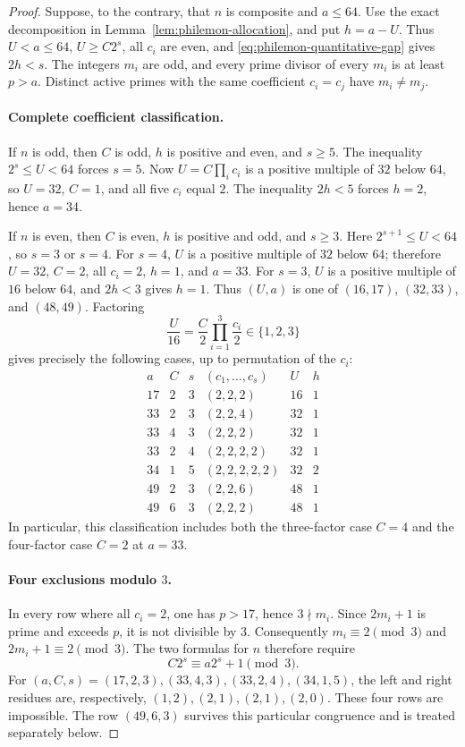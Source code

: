 \documentclass[11pt,a4paper]{article}
\theoremstyle{definition}\newtheorem{definition}[theorem]{Definition}
\theoremstyle{remark}\newtheorem{remark}[theorem]{Remark}
\begin{document}
\begin{proof}
Suppose, to the contrary, that $n$ is composite and $a\leq64$.
Use the exact decomposition in Lemma~\ref{lem:philemon-allocation}, and
put $h=a-U$.  Thus $U<a\leq64$, $U\geq C2^s$, all $c_i$ are even,
and \eqref{eq:philemon-quantitative-gap} gives $2h<s$.
The integers $m_i$ are odd, and every prime divisor of every $m_i$ is
at least $p>a$.  Distinct active primes with the same coefficient
$c_i=c_j$ have $m_i\ne m_j$.

\paragraph{Complete coefficient classification.}
If $n$ is odd, then $C$ is odd, $h$ is positive and even, and $s\geq5$.
The inequality $2^s\leq U<64$ forces $s=5$.
Now $U=C\prod_i c_i$ is a positive multiple of $32$ below $64$, so
$U=32$, $C=1$, and all five $c_i$ equal $2$.
The inequality $2h<5$ forces $h=2$, hence $a=34$.

If $n$ is even, then $C$ is even, $h$ is positive and odd, and $s\geq3$.
Here $2^{s+1}\leq U<64$, so $s=3$ or $s=4$.
For $s=4$, $U$ is a positive multiple of $32$ below $64$;
therefore $U=32$, $C=2$, all $c_i=2$, $h=1$, and $a=33$.
For $s=3$, $U$ is a positive multiple of $16$ below $64$, and $2h<3$
gives $h=1$.  Thus $(U,a)$ is one of $(16,17)$, $(32,33)$, and
$(48,49)$.  Factoring
\[
 \frac{U}{16}=\frac{C}{2}\prod_{i=1}^3\frac{c_i}{2}
 \in\{1,2,3\}
\]
gives precisely the following cases, up to permutation of the $c_i$:
\begin{equation}\label{eq:philemon-64-cases}
\begin{array}{c|c|c|c|c|c}
 a&C&s&(c_1,\ldots,c_s)&U&h\\ \hline
 17&2&3&(2,2,2)&16&1\\
 33&2&3&(2,2,4)&32&1\\
 33&4&3&(2,2,2)&32&1\\
 33&2&4&(2,2,2,2)&32&1\\
 34&1&5&(2,2,2,2,2)&32&2\\
 49&2&3&(2,2,6)&48&1\\
 49&6&3&(2,2,2)&48&1
\end{array}
\end{equation}
In particular, this classification includes both the three-factor case
$C=4$ and the four-factor case $C=2$ at $a=33$.

\paragraph{Four exclusions modulo $3$.}
In every row where all $c_i=2$, one has $p>17$, hence $3\nmid m_i$.
Since $2m_i+1$ is prime and exceeds $p$, it is not divisible by $3$.
Consequently $m_i\equiv2\pmod3$ and $2m_i+1\equiv2\pmod3$.
The two formulas for $n$ therefore require
\begin{equation}\label{eq:philemon-64-mod3}
 C2^s\equiv a2^s+1\pmod3.
\end{equation}
For $(a,C,s)=(17,2,3),(33,4,3),(33,2,4),(34,1,5)$, the left and
right residues are, respectively, $(1,2),(2,1),(2,1),(2,0)$.
These four rows are impossible.  The row $(49,6,3)$ survives this
particular congruence and is treated separately below.


\end{proof}
\end{document}
